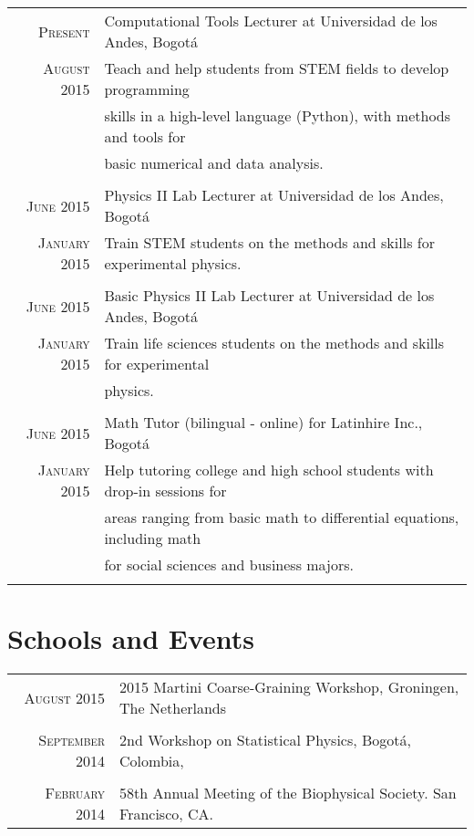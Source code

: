 \documentclass[a4paper,10pt]{article} %
\begin{document}
\begin{tabular}{rl}

\textsc{Present} & Computational Tools Lecturer at Universidad de los Andes, Bogot\'a  \\ 
\textsc{August 2015} & Teach and help students from STEM fields to develop programming  \\ & skills in a high-level language (Python), with methods and tools for  \\ & basic numerical and data analysis. \\
\\

\textsc{June 2015} & Physics II Lab Lecturer at Universidad de los Andes, Bogot\'a  \\ 
\textsc{January 2015} & Train STEM students on the methods and skills for experimental physics.\\
\\

\textsc{June 2015} & Basic Physics II Lab Lecturer at Universidad de los Andes, Bogot\'a \\ 
\textsc{January 2015} & Train life sciences students on the methods and skills for experimental  \\ & physics.\\
\\

\textsc{June 2015} & Math Tutor (bilingual - online) for Latinhire Inc., Bogot\'a\\ 
\textsc{January 2015} & Help tutoring college and high school students with drop-in sessions for \\ & areas ranging from basic math to differential equations, including math  \\ & for social sciences and business majors. \\
\\

\end{tabular}


\color{OrangeRed}
\section{Schools and Events}
\color{black}

\begin{tabular}{rl}

\textsc{August 2015} & 2015 Martini Coarse-Graining Workshop, Groningen, The Netherlands \\
&\\

\textsc{September 2014} &  2nd Workshop on Statistical Physics, Bogotá, Colombia, \\
&\\

\textsc{February 2014} &  58th Annual Meeting of the Biophysical Society. San Francisco, CA. \\

\end{tabular}
\end{document}
